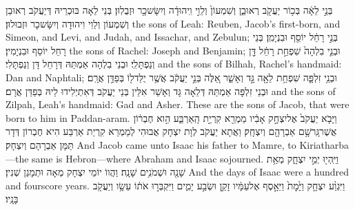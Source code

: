 {בְּנֵ֣י לֵאָ֔ה בְּכ֥וֹר יַעֲקֹ֖ב רְאוּבֵ֑ן וְשִׁמְעוֹן֙ וְלֵוִ֣י וִֽיהוּדָ֔ה וְיִשָּׂשכָ֖ר וּזְבֻלֽוּן׃}
{בְּנֵי לֵאָה בּוּכְרֵיהּ דְּיַעֲקֹב רְאוּבֵן וְשִׁמְעוֹן וְלֵוִי וִיהוּדָה וְיִשָּׂשכָר וּזְבוּלוּן׃}
{the sons of Leah: Reuben, Jacob’s first-born, and Simeon, and Levi, and Judah, and Issachar, and Zebulun;}{}
{בְּנֵ֣י רָחֵ֔ל יוֹסֵ֖ף וּבִנְיָמִֽן׃}
{בְּנֵי רָחֵל יוֹסֵף וּבִנְיָמִין׃}
{the sons of Rachel: Joseph and Benjamin;}{}
{וּבְנֵ֤י בִלְהָה֙ שִׁפְחַ֣ת רָחֵ֔ל דָּ֖ן וְנַפְתָּלִֽי׃}
{וּבְנֵי בִלְהָה אַמְתַּהּ דְּרָחֵל דָּן וְנַפְתָּלִי׃}
{and the sons of Bilhah, Rachel’s handmaid: Dan and Naphtali;}{}
{וּבְנֵ֥י זִלְפָּ֛ה שִׁפְחַ֥ת לֵאָ֖ה גָּ֣ד וְאָשֵׁ֑ר אֵ֚לֶּה בְּנֵ֣י יַעֲקֹ֔ב אֲשֶׁ֥ר יֻלַּד\maqqaf ל֖וֹ בְּפַדַּ֥ן אֲרָֽם׃}
{וּבְנֵי זִלְפָּה אַמְתַּהּ דְּלֵאָה גָּד וְאָשֵׁר אִלֵּין בְּנֵי יַעֲקֹב דְּאִתְיְלִידוּ לֵיהּ בְּפַדַּן אֲרָם׃}
{and the sons of Zilpah, Leah’s handmaid: Gad and Asher. These are the sons of Jacob, that were born to him in Paddan-aram.}{}
{וַיָּבֹ֤א יַעֲקֹב֙ אֶל\maqqaf יִצְחָ֣ק אָבִ֔יו מַמְרֵ֖א קִרְיַ֣ת הָֽאַרְבַּ֑ע הִ֣וא חֶבְר֔וֹן אֲשֶׁר\maqqaf גָּֽר\maqqaf שָׁ֥ם אַבְרָהָ֖ם וְיִצְחָֽק׃}
{וַאֲתָא יַעֲקֹב לְוָת יִצְחָק אֲבוּהִי לְמַמְרֵא קִרְיַת אַרְבַּע הִיא חֶבְרוֹן דְּדָר תַּמָּן אַבְרָהָם וְיִצְחָק׃}
{And Jacob came unto Isaac his father to Mamre, to Kiriatharba—the same is Hebron—where Abraham and Isaac sojourned.}{}
{וַיִּֽהְי֖וּ יְמֵ֣י יִצְחָ֑ק מְאַ֥ת שָׁנָ֖ה וּשְׁמֹנִ֥ים שָׁנָֽה׃}
{וַהֲווֹ יוֹמֵי יִצְחָק מְאָה וּתְמָנַן שְׁנִין׃}
{And the days of Isaac were a hundred and fourscore years.}{}
{וַיִּגְוַ֨ע יִצְחָ֤ק וַיָּ֙מׇת֙ וַיֵּאָ֣סֶף אֶל\maqqaf עַמָּ֔יו זָקֵ֖ן וּשְׂבַ֣ע יָמִ֑ים וַיִּקְבְּר֣וּ אֹת֔וֹ עֵשָׂ֥ו וְיַעֲקֹ֖ב בָּנָֽיו׃ \petucha }
